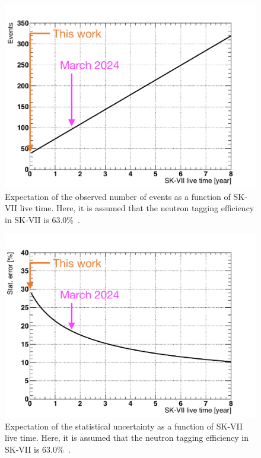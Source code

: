 \begin{figure}[h]
	\centering
	\includegraphics[width=12cm]{Figures/Conclusion/event}
	\caption[Expectation of the observed number of events as a function of SK-VII live time]{
	Expectation of the observed number of events as a function of SK-VII live time.
	Here, it is assumed that the neutron tagging efficiency in SK-VII is 63.0\%~\cite{2023KanemuraSlide}.
	}\label{Future_Event_BERT_event}
\end{figure}

\begin{figure}[h]
	\centering
	\includegraphics[width=12cm]{Figures/Conclusion/stat_error}
	\caption[Expectation of the statistical uncertainty as a function of SK-VII live time]{
	Expectation of the statistical uncertainty as a function of SK-VII live time.
	Here, it is assumed that the neutron tagging efficiency in SK-VII is 63.0\%~\cite{2023KanemuraSlide}.
	}\label{Future_Event_BERT_stat_error}
\end{figure}

